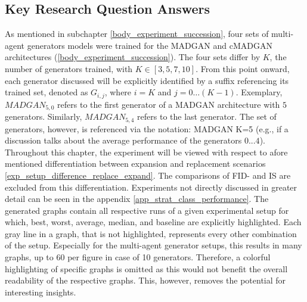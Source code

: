 \subsection{Key Research Question Answers} \label{exp_results_questions_answers}
As mentioned in subchapter \ref{body_experiment_succession}, four sets of multi-agent generators models were trained  for the MADGAN and cMADGAN architectures (\ref{body_experiment_succession}). The four sets differ by \(K\), the number of generators trained, with \(K \in [3, 5, 7, 10]\). From this point onward, each generator discussed will be explicitly identified by a suffix referencing its trained set, denoted as \(G_{i,j}\), where \(i = K\) and \(j = 0 \ldots (K - 1)\). Exemplary, \(MADGAN_{5,0}\) refers to the first generator of a MADGAN architecture with $5$ generators. Similarly, \(MADGAN_{5,4}\) refers to the last generator. The set of generators, however, is referenced via the notation: MADGAN K=5 (e.g., if a discussion talks about the average performance of the generators \(0...4\)). Throughout this chapter, the experiment will be viewed with respect to afore mentioned differentiation between expansion and replacement scenarios \ref{exp_setup_difference_replace_expand}. The comparisons of FID- and IS are excluded from this differentiation. Experiments not directly discussed in greater detail can be seen in the appendix \ref{app_strat_class_performance}.
The generated graphs contain all respective runs of a given experimental setup for which, best, worst, average, median, and baseline are explicitly highlighted. Each gray line in a graph, that is not highlighted, represents every other combination of the setup. Especially for the multi-agent generator setups, this results in many graphs, up to $60$ per figure in case of 10 generators. Therefore, a colorful highlighting of specific graphs is omitted as this would not benefit the overall readability of the respective graphs. This, however, removes the potential for interesting insights.

\newpage
